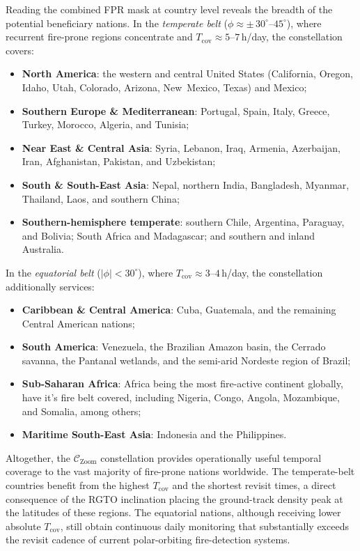 Reading the combined FPR mask at country level reveals the breadth of the potential beneficiary nations.  In the \emph{temperate belt} ($\phi \approx \pm\,30^{\circ}$--$45^{\circ}$), where recurrent fire-prone regions concentrate and $T_{\text{cov}} \approx 5$--$7$\,h/day, the constellation covers:
\begin{itemize}[nosep]
    \item \textbf{North America}: the western and central United States (California, Oregon, Idaho, Utah, Colorado, Arizona, New~Mexico, Texas) and Mexico;
    \item \textbf{Southern Europe \& Mediterranean}: Portugal, Spain, Italy, Greece, Turkey, Morocco, Algeria, and Tunisia;
    \item \textbf{Near East \& Central Asia}: Syria, Lebanon, Iraq, Armenia, Azerbaijan, Iran, Afghanistan, Pakistan, and Uzbekistan;
    \item \textbf{South \& South-East Asia}: Nepal, northern India, Bangladesh, Myanmar, Thailand, Laos, and southern China;
    \item \textbf{Southern-hemisphere temperate}: southern Chile, Argentina, Paraguay, and Bolivia; South Africa and Madagascar; and southern and inland Australia.
\end{itemize}
In the \emph{equatorial belt} ($|\phi| < 30^{\circ}$), where $T_{\text{cov}} \approx 3$--$4$\,h/day, the constellation additionally services:
\begin{itemize}[nosep]
    \item \textbf{Caribbean \& Central America}: Cuba, Guatemala, and the remaining Central American nations;
    \item \textbf{South America}: Venezuela, the Brazilian Amazon basin, the Cerrado savanna, the Pantanal wetlands, and the semi-arid Nordeste region of Brazil;
    \item \textbf{Sub-Saharan Africa}: Africa being the most fire-active continent globally, have it's fire belt covered, including Nigeria, Congo, Angola, Mozambique, and Somalia, among others;
    \item \textbf{Maritime South-East Asia}: Indonesia and the Philippines.
\end{itemize}
Altogether, the $\mathcal{C}_{\text{Zoom}}$ constellation provides operationally useful temporal coverage to the vast majority of fire-prone nations worldwide.  The temperate-belt countries benefit from the highest $T_{\text{cov}}$ and the shortest revisit times, a direct consequence of the RGTO inclination placing the ground-track density peak at the latitudes of these regions. The equatorial nations, although receiving lower absolute $T_{\text{cov}}$, still obtain continuous daily monitoring that substantially exceeds the revisit cadence of current polar-orbiting fire-detection systems.

